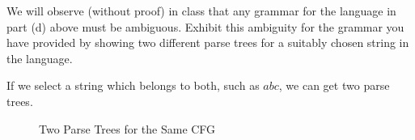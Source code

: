 \begin{problem}{2}
  We will observe (without proof) in class that any grammar for the language in part (d) above must be ambiguous.
  Exhibit this ambiguity for the grammar you have provided by showing two different parse trees for a suitably chosen
  string in the language.
  \begin{solution}
    If we select a string which belongs to both, such as $abc$, we can get two parse trees.
    \begin{figure}[H]
      \centering
      \caption{Two Parse Trees for the Same CFG}
    \end{figure}
  \end{solution}
\end{problem}


